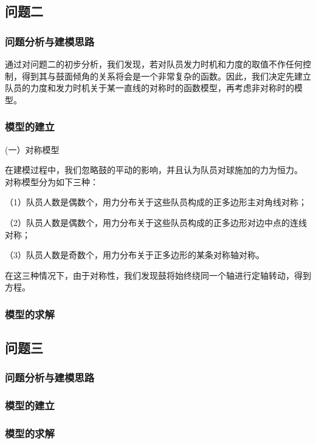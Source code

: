 \documentclass[withoutpreface,bwprint]{cumcmthesis} %
\begin{document}
\subsection{问题二}
	\subsubsection{问题分析与建模思路}
通过对问题二的初步分析，我们发现，若对队员发力时机和力度的取值不作任何控制，得到其与鼓面倾角的关系将会是一个非常复杂的函数。因此，我们决定先建立队员的力度和发力时机关于某一直线的对称时的函数模型，再考虑非对称时的模型。

	\subsubsection{模型的建立}
(一）对称模型 \par
在建模过程中，我们忽略鼓的平动的影响，并且认为队员对球施加的力为恒力。
对称模型分为如下三种：\par
（1）队员人数是偶数个，用力分布关于这些队员构成的正多边形主对角线对称；\par
（2）队员人数是偶数个，用力分布关于这些队员构成的正多边形对边中点的连线对称；\par
（3）队员人数是奇数个，用力分布关于正多边形的某条对称轴对称。\par
在这三种情况下，由于对称性，我们发现鼓将始终绕同一个轴进行定轴转动，得到方程。

	\subsubsection{模型的求解}

\subsection{问题三}
	\subsubsection{问题分析与建模思路}


	\subsubsection{模型的建立}


	\subsubsection{模型的求解}
\end{document}
